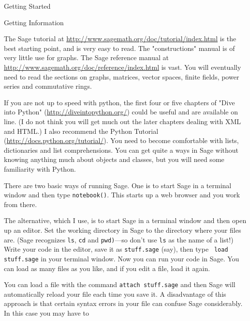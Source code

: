 \begin{chap}{Getting Started}
    
\begin{sect}{Getting Information}
%
\begin{para}
The Sage tutorial at \url{http://www.sagemath.org/doc/tutorial/index.html}
is the best starting point, and is very easy to read.  The "constructions" manual 
is of very little use for graphs. The Sage reference manual at
\url{http://www.sagemath.org/doc/reference/index.html} is vast. You will eventually 
need to read the sections on graphs, matrices, vector spaces, finite fields,
power series and commutative rings.
\end{para}
%
\begin{para}
If you are not up to speed with python, the first four or five chapters of 
"Dive into Python"  (\url{http://diveintopython.org/})
could be useful and are available on line.  (I do not think
you will get much out the later chapters dealing with XML and HTML.)
I also recommend the Python Tutorial (\url{http://docs.python.org/tutorial/}).  
You need to become comfortable with lists, dictionaries and list comprehensions.
You can get quite a ways in Sage without knowing anything much about objects 
and classes, but you will need some familiarity with Python.
\end{para}
%
\begin{para}
There are two basic ways of running Sage.  One is to start Sage in a
terminal window and then type \texttt{notebook()}.  This starts up a 
web browser and you work from there.
\end{para}
%
\begin{para}
The alternative, which I use, is to start Sage in a terminal window and then 
open up an editor. Set the working directory in Sage to the directory where your 
files are. (Sage recognizes \texttt{ls}, \texttt{cd} and \texttt{pwd)}---so don't use
\texttt{ls} as the name of a list!) Write your code in the editor, save it as
\texttt{stuff.sage} (say), then type  \texttt{ load stuff.sage} in your terminal window. 
Now you can run your code in Sage. You can load as many files as you like, and if 
you edit a file, load it again.
\end{para}
%
\begin{para}
You can load a file with the command \texttt{attach stuff.sage} and then
Sage will automatically reload your file each time
you save it.  A disadvantage of this approach is that certain syntax errors 
in your file can confuse Sage considerably.  In this case you may have to 

\end{para}
\end{sect}
\end{chap}

